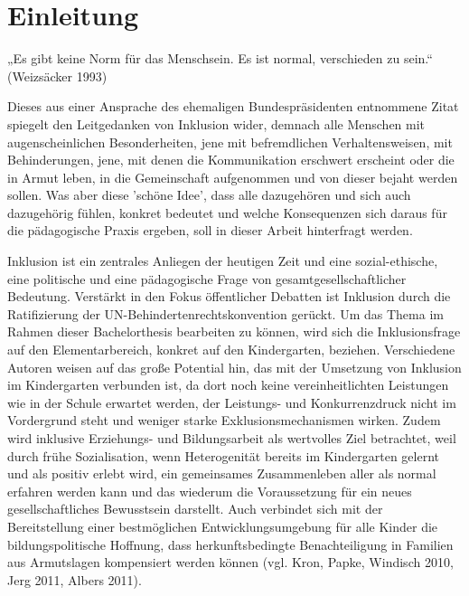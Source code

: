 \chapter{Einleitung}

„Es gibt keine Norm für das Menschsein. Es ist normal, verschieden zu sein.“ (Weizsäcker 1993) 

Dieses aus einer Ansprache des ehemaligen Bundespräsidenten entnommene Zitat spiegelt den Leitgedanken von Inklusion wider, demnach alle Menschen mit augenscheinlichen Besonderheiten, jene mit befremdlichen Verhaltensweisen, mit Behinderungen, jene, mit denen die Kommunikation erschwert erscheint oder die in Armut leben, in die Gemeinschaft aufgenommen und von dieser bejaht werden sollen. 
Was aber diese 'schöne Idee', dass alle dazugehören und sich auch dazugehörig fühlen, konkret bedeutet und welche Konsequenzen sich daraus für die pädagogische Praxis ergeben, soll in dieser Arbeit hinterfragt werden.

Inklusion ist ein zentrales Anliegen der heutigen Zeit und eine sozial-ethische, eine politische und eine pädagogische Frage von gesamtgesellschaftlicher Bedeutung. Verstärkt in den Fokus öffentlicher Debatten ist Inklusion durch die Ratifizierung der UN-Behindertenrechtskonvention gerückt.
Um das Thema im Rahmen dieser Bachelorthesis bearbeiten zu können, wird 
sich die Inklusionsfrage auf den Elementarbereich, konkret auf den Kindergarten, beziehen. Verschiedene Autoren weisen auf das große Potential hin, das mit der Umsetzung von Inklusion im Kindergarten verbunden ist, da dort noch keine vereinheitlichten Leistungen wie in der Schule erwartet werden, der Leistungs- und Konkurrenzdruck nicht im Vordergrund steht und weniger starke Exklusionsmechanismen wirken. Zudem wird inklusive Erziehungs- und Bildungsarbeit als wertvolles Ziel betrachtet, weil durch frühe Sozialisation, wenn Heterogenität bereits im Kindergarten gelernt und als positiv erlebt wird, ein gemeinsames Zusammenleben aller als normal erfahren werden kann und das wiederum die Voraussetzung für ein neues gesellschaftliches Bewusstsein darstellt. Auch verbindet sich mit der Bereitstellung einer bestmöglichen Entwicklungsumgebung für alle Kinder die bildungspolitische Hoffnung, dass herkunftsbedingte Benachteiligung in Familien aus Armutslagen kompensiert werden können (vgl. Kron, Papke, Windisch 2010, Jerg 2011, Albers 2011). 

